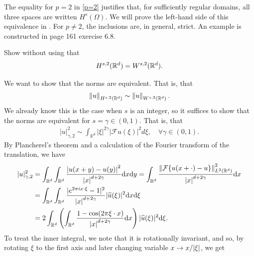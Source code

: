 \documentclass[
    a4paper,
    DIV=14,
    abstract=true,
    numbers=noenddot
]{scrartcl}
\begin{document}
The equality for $p=2$ in \eqref{p=2} justifies that, for sufficiently regular domains, all three spaces are written $H^s(\Omega )$.   We will prove the left-hand side of this equivalence in . For $p\neq 2$, the inclusions are, in general, strict. An example is constructed in \cite{stein1970singular} page 161 exercise 6.8.
\begin{exercise}\label{equivalence of fractional spaces}
    Show without using  that
    \begin{align*}
        H^{s,2}(\mathbb{R}^d)=W^{s,2}(\mathbb{R}^d).
    \end{align*}
\end{exercise}
\begin{hint}
    We want to show that the norms are equivalent. That is, that
    \begin{align*}
        \left\lVert u \right\rVert_{H^{s,2}(\mathbb{R}^d)}\sim\left\lVert u \right\rVert_{W^{s,2}(\mathbb{R}^d)}.
    \end{align*}
    We already know this is the case when $s$ is an integer, so it suffices to show that the norms are equivalent for $s= \gamma  \in (0,1)$. That is, that
    \begin{align*}
        |u|_{\gamma ,2}^2\sim \int_{\mathbb{R}^d}|\xi|^{2 \gamma }|\mathcal{F} u(\xi)|^2 d \xi , \quad\forall \gamma \in (0,1).
    \end{align*}
    By Plancherel's theorem and a calculation of the Fourier transform of the translation, we have
    \begin{align*}
        |u|_{\gamma ,2}^2 & =\int_{\mathbb{R}^d}\int_{\mathbb{R}^d}\frac{{\left| u(x+y)-u(y) \right|}^2}{{\left| x \right|}^{d+2\gamma	}}\mathrm{d} x \mathrm{d} y                                                                                                       = \int_{\mathbb{R}^d}\frac{\left\lVert \mathcal{F} \{u(x+\cdot )-u\} \right\rVert^2_{L^2(\mathbb{R}^d)}}{{\left| x \right|}^{d+2\gamma	}}\mathrm{d} x \\
                          & =\int_{\mathbb{R}^d}\int_{\mathbb{R}^d}  \frac{|e^{2 \pi i x \cdot \xi}-1|^2}{{\left| x \right|}^{d+2\gamma	}}|\widehat{u}(\xi)|^2\mathrm{d} x\mathrm{d}\xi                                                                                                                                                                     \\&=2\int_{\mathbb{R}^d}\left(\int_{\mathbb{R}^d}  \frac{1-\cos(2\pi \xi\cdot x)}{{\left| x \right|}^{d+2\gamma	}}\mathrm{d} x\right)|\widehat{u}(\xi)|^2\mathrm{d}\xi.
    \end{align*}
    To treat the inner integral, we note that it is rotationally invariant, and so, by rotating $\xi$ to the first axis and later changing variable $x \to x / {\left| \xi \right|}$, we get

\end{hint}
\end{document}
